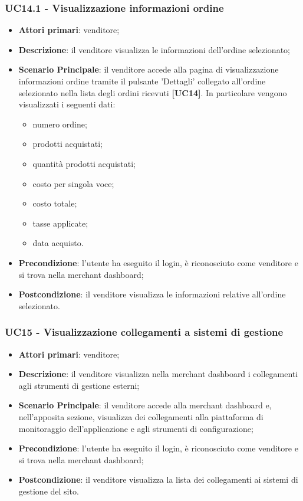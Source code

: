 \subsubsection{UC14.1 - Visualizzazione informazioni ordine}
\begin{itemize}
\item \textbf{Attori primari}: venditore;
\item \textbf{Descrizione}: il venditore visualizza le informazioni dell'ordine selezionato;
\item \textbf{Scenario Principale}: il venditore accede alla pagina di visualizzazione informazioni ordine tramite il pulsante 'Dettagli' collegato all'ordine selezionato nella lista degli ordini ricevuti \textbf{[UC14]}. In particolare vengono visualizzati i seguenti dati:
\begin{itemize}
	\item numero ordine;
	\item prodotti acquistati;
	\item quantità prodotti acquistati;
	\item costo per singola voce;
	\item costo totale;
	\item tasse applicate;
	\item data acquisto.
\end{itemize}
\item \textbf{Precondizione}: l'utente ha eseguito il login, è riconosciuto come venditore e si trova nella merchant dashboard;
\item \textbf{Postcondizione}: il venditore visualizza le informazioni relative all'ordine selezionato.
\end{itemize}

\subsubsection{UC15 - Visualizzazione collegamenti a sistemi di gestione}
\begin{itemize}
\item \textbf{Attori primari}: venditore;
\item \textbf{Descrizione}: il venditore visualizza nella merchant dashboard i collegamenti agli strumenti di gestione esterni;
\item \textbf{Scenario Principale}: il venditore accede alla merchant dashboard e, nell'apposita sezione, visualizza dei collegamenti alla piattaforma di monitoraggio dell'applicazione e agli strumenti di configurazione;
\item \textbf{Precondizione}: l'utente ha eseguito il login, è riconosciuto come venditore e si trova nella merchant dashboard;
\item \textbf{Postcondizione}: il venditore visualizza la lista dei collegamenti ai sistemi di gestione del sito.
\end{itemize}

